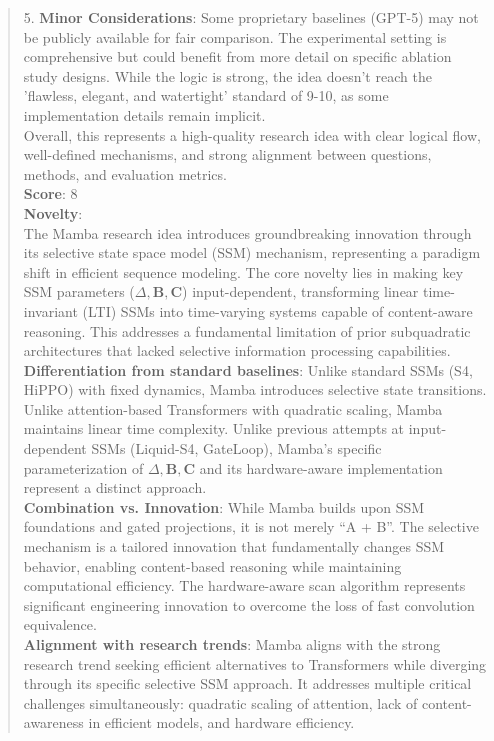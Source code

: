 \begin{quote}
\begin{tcolorbox}[breakable,colback=almond!20!white, colframe=almond!60!black, title=\textbf{Case Study (Mamba: Linear-Time Sequence Modeling with Selective State Spaces)}]
        5. \textbf{Minor Considerations}: Some proprietary baselines (GPT-5) may not be publicly available for fair comparison. The experimental setting is comprehensive but could benefit from more detail on specific ablation study designs. While the logic is strong, the idea doesn't reach the 'flawless, elegant, and watertight' standard of 9-10, as some implementation details remain implicit.\\
        Overall, this represents a high-quality research idea with clear logical flow, well-defined mechanisms, and strong alignment between questions, methods, and evaluation metrics.\\
        \textbf{Score}: 8\\

        \textbf{Novelty}:\\
        The Mamba research idea introduces groundbreaking innovation through its selective state space model (SSM) mechanism, representing a paradigm shift in efficient sequence modeling. The core novelty lies in making key SSM parameters ($\Delta, \boldsymbol{B}, \boldsymbol{C}$) input-dependent, transforming linear time-invariant (LTI) SSMs into time-varying systems capable of content-aware reasoning. This addresses a fundamental limitation of prior subquadratic architectures that lacked selective information processing capabilities.\\
        \textbf{Differentiation from standard baselines}: Unlike standard SSMs (S4, HiPPO) with fixed dynamics, Mamba introduces selective state transitions. Unlike attention-based Transformers with quadratic scaling, Mamba maintains linear time complexity. Unlike previous attempts at input-dependent SSMs (Liquid-S4, GateLoop), Mamba's specific parameterization of $\Delta, \boldsymbol{B}, \boldsymbol{C}$ and its hardware-aware implementation represent a distinct approach.\\
        \textbf{Combination vs. Innovation}: While Mamba builds upon SSM foundations and gated projections, it is not merely ``A + B''. The selective mechanism is a tailored innovation that fundamentally changes SSM behavior, enabling content-based reasoning while maintaining computational efficiency. The hardware-aware scan algorithm represents significant engineering innovation to overcome the loss of fast convolution equivalence.\\
        \textbf{Alignment with research trends}: Mamba aligns with the strong research trend seeking efficient alternatives to Transformers while diverging through its specific selective SSM approach. It addresses multiple critical challenges simultaneously: quadratic scaling of attention, lack of content-awareness in efficient models, and hardware efficiency.\\

\end{tcolorbox}
\end{quote}
